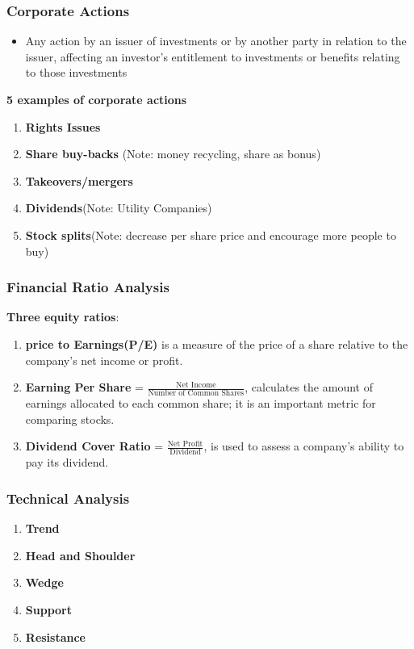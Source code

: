 \documentclass{article}
\theoremstyle{definition}
\theoremstyle{thrm}
\theoremstyle{lma}
\theoremstyle{ppst}
\theoremstyle{crlr}
\begin{document}
\subsubsection{Corporate Actions}
\begin{itemize}
	\item Any action by an issuer of investments or by another party in relation to the issuer, affecting an investor's entitlement to investments or benefits relating to those investments
\end{itemize}
\textbf{5 examples of corporate actions}
\begin{enumerate}
	\item \textbf{Rights Issues}
	\item \textbf{Share buy-backs} (Note: money recycling, share as bonus)
	\item \textbf{Takeovers/mergers}
	\item \textbf{Dividends}(Note: Utility Companies)
	\item \textbf{Stock splits}(Note: decrease per share price and encourage more people to buy)
\end{enumerate}
\subsubsection{Financial Ratio Analysis}
\textbf{Three equity ratios}:
\begin{enumerate}
	\item \textbf{price to Earnings(P/E)} is a measure of the price of a share relative to the company's net income or profit.
	\item \textbf{Earning Per Share} = $\frac{\text{Net Income}}{\text{Number of Common Shares}}$, calculates the amount of earnings allocated to each common share; it is an important metric for comparing stocks.
	\item \textbf{Dividend Cover Ratio} = $\frac{\text{Net Profit}}{\text{Dividend}}$, is used to assess a company's ability to pay its dividend.
\end{enumerate}
\subsubsection{Technical Analysis}
\begin{enumerate}
	\item \textbf{Trend}
	\item \textbf{Head and Shoulder}
	\item \textbf{Wedge}
	\item \textbf{Support}
	\item \textbf{Resistance}
\end{enumerate}
\end{document}
